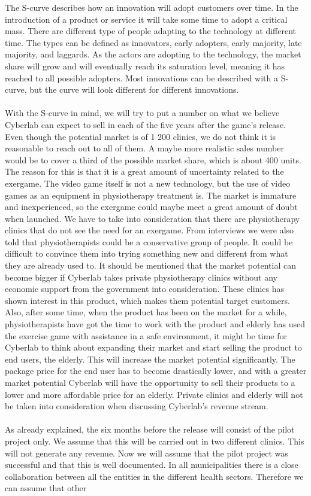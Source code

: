 The S-curve describes how an innovation will adopt customers over time. In the introduction of a product or service it will take some time to adopt a critical mass. There are different type of people adapting to the technology at different time. The types can be defined as innovators, early adopters, early majority, late majority, and laggards. As the actors are adopting to the technology, the market share will grow and will eventually reach its saturation level, meaning it has reached to all possible adopters. Most innovations can be described with a S-curve, but the curve will look different for different innovations.\cite{scurve}\\ \\
With the S-curve in mind, we will try to put a number on what we believe Cyberlab can expect to sell in each of the five years after the game’s release. Even though the potential market is of 1 200 clinics, we do not think it is reasonable to reach out to all of them. A maybe more realistic sales number would be to cover a third of the possible market share, which is about 400 units. The reason for this is that it is a great amount of uncertainty related to the exergame. The video game itself is not a new technology, but the use of video games as an equipment in physiotherapy treatment is. The market is immature and inexperienced, so the exergame could maybe meet a great amount of doubt when launched. We have to take into consideration that there are physiotherapy clinics that do not see the need for an exergame. From interviews we were also told that physiotherapists could be a conservative group of people. It could be difficult to convince them into trying something new and different from what they are already used to. It should be mentioned that the market potential can become bigger if Cyberlab takes private physiotherapy clinics without any economic support from the government into consideration. These clinics has shown interest in this product, which makes them potential target customers. Also, after some time, when the product has been on the market for a while, physiotherapists have got the time to work with the product and elderly has used the exercise game with assistance in a safe environment, it might be time for Cyberlab to think about expanding their market and start selling the product to end users, the elderly. This will increase the market potential significantly. The package price for the end user has to become drastically lower, and with a greater market potential Cyberlab will have the opportunity to sell their products to a lower and more affordable price for an elderly. Private clinics and elderly will not be taken into consideration when discussing Cyberlab's revenue stream.\\ \\ As already explained, the six months before the release will consist of the pilot project only. We assume that this will be carried out in two different clinics. This will not generate any revenue. Now we will assume that the pilot project was successful and that this is well documented. In all municipalities there is a close collaboration between all the entities in the different health sectors. Therefore we can assume that other 